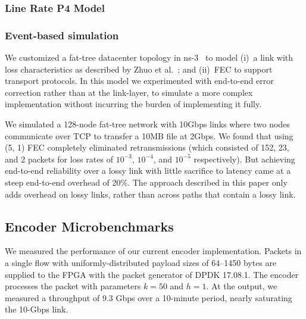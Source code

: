 \subsubsection{Line Rate P4 Model} 




\subsubsection{Event-based simulation}
We customized a fat-tree datacenter topology in ns-3~\cite{ns3-dcn} to
model (i)~a link with loss characteristics as described by Zhuo et
al.~\cite{Zhuo:2017:UMP:3098822.3098849}; and (ii)~FEC to support
transport protocols. In this model we experimented with end-to-end
error correction rather than at the link-layer, to simulate a more complex
implementation without incurring the burden of implementing it fully.

We simulated a 128-node fat-tree network with 10Gbps links where two
nodes communicate over TCP to transfer a 10MB file at 2Gbps. We found
that using (5, 1) FEC completely eliminated retransmissions (which consisted
  of 152, 23, and 2 packets for loss rates of $10^{-3}$, $10^{-4}$,
and $10^{-5}$ respectively). But achieving end-to-end reliability
over a lossy link with little sacrifice to latency came at a steep
end-to-end overhead of 20\%.
The approach described in this paper only adds
overhead on lossy links, rather than across paths that contain a
lossy link.


\subsection{Encoder Microbenchmarks}

We measured the performance of our current encoder implementation.  Packets
in a single flow with uniformly-distributed payload sizes of 64--1450 bytes are
supplied to the FPGA with the packet generator of DPDK 17.08.1. The encoder
processes the packet with parameters $k = 50$ and $h = 1$.
At the output, we measured a throughput of 9.3 Gbps over a 10-minute period,
nearly saturating the 10-Gbps link.

